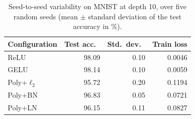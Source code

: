 \begin{table}[t]
\centering
\caption{Seed-to-seed variability on MNIST at depth 10, over five random seeds (mean $\pm$ standard deviation of the test accuracy in \%).}
\label{tab:seeds}
\small
\begin{tabular}{lrrr}
\toprule
Configuration & Test acc.\ & Std.\ dev.\ & Train loss \\
\midrule
ReLU & 98.09 & 0.10 & 0.0046 \\
GELU & 98.14 & 0.10 & 0.0059 \\
Poly+$\ell_2$ & 95.72 & 0.20 & 0.1194 \\
Poly+BN & 96.83 & 0.05 & 0.0721 \\
Poly+LN & 96.15 & 0.11 & 0.0827 \\
\bottomrule
\end{tabular}
\end{table}